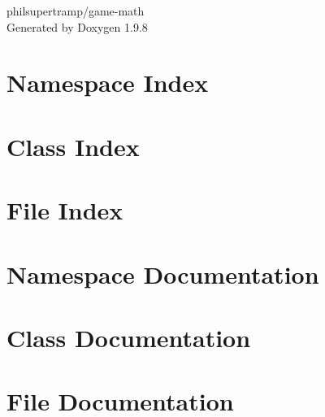 \documentclass[twoside]{book}
\newcommand{\+}{\discretionary{\mbox{\scriptsize$\hookleftarrow$}}{}{}}
\newcommand{\clearemptydoublepage}{%
    \newpage{\pagestyle{empty}\cleardoublepage}%
  }
\begin{document}
  \raggedbottom
    \hypersetup{pageanchor=false,
                bookmarksnumbered=true,
                pdfencoding=unicode
               }
  \begin{titlepage}
  \vspace*{7cm}
  \begin{center}%
  {\Large philsupertramp/game-\/math}\\
  \vspace*{1cm}
  {\large Generated by Doxygen 1.9.8}\\
  \end{center}
  \end{titlepage}
  \clearemptydoublepage
  \tableofcontents
  \clearemptydoublepage
  \hypersetup{pageanchor=true}

\chapter{Namespace Index}

\chapter{Class Index}

\chapter{File Index}

\chapter{Namespace Documentation}



\chapter{Class Documentation}











\chapter{File Documentation}



























\end{document}
